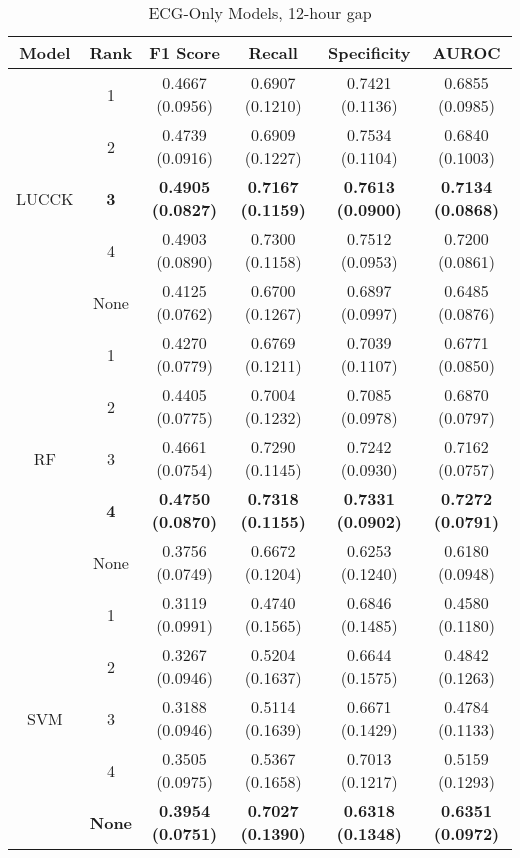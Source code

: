 \begin{table}
    \centering
    \caption{ECG-Only Models, 12-hour gap}
    \begin{tabularx}{\textwidth}{|C|C|C|C|C|C|}
        \hline
        Model & Rank & F1 Score & Recall & Specificity & AUROC \\
        \hline
         & 1 & 0.4667 (0.0956) & 0.6907 (0.1210) & 0.7421 (0.1136) & 0.6855 (0.0985)\\
         & 2 & 0.4739 (0.0916) & 0.6909 (0.1227) & 0.7534 (0.1104) & 0.6840 (0.1003)\\
        LUCCK & \textbf{3} & \textbf{0.4905 (0.0827)} & \textbf{0.7167 (0.1159)} & \textbf{0.7613 (0.0900)} & \textbf{0.7134 (0.0868)}\\
         & 4 & 0.4903 (0.0890) & 0.7300 (0.1158) & 0.7512 (0.0953) & 0.7200 (0.0861)\\
         & None & 0.4125 (0.0762) & 0.6700 (0.1267) & 0.6897 (0.0997) & 0.6485 (0.0876)\\
        \hline
        & 1 &  0.4270 (0.0779) & 0.6769 (0.1211) & 0.7039 (0.1107) & 0.6771 (0.0850)\\
         & 2 & 0.4405 (0.0775) & 0.7004 (0.1232) & 0.7085 (0.0978) & 0.6870 (0.0797)\\
        RF & 3 & 0.4661 (0.0754) & 0.7290 (0.1145) & 0.7242 (0.0930) & 0.7162 (0.0757)\\
         & \textbf{4} & \textbf{0.4750 (0.0870)} & \textbf{0.7318 (0.1155)} & \textbf{0.7331 (0.0902)} & \textbf{0.7272 (0.0791)}\\
         & None & 0.3756 (0.0749) & 0.6672 (0.1204) & 0.6253 (0.1240) & 0.6180 (0.0948)\\
         \hline
         & 1 & 0.3119 (0.0991) & 0.4740 (0.1565) & 0.6846 (0.1485) & 0.4580 (0.1180)\\
         & 2 & 0.3267 (0.0946) & 0.5204 (0.1637) & 0.6644 (0.1575) & 0.4842 (0.1263)\\
        SVM & 3 & 0.3188 (0.0946) & 0.5114 (0.1639) & 0.6671 (0.1429) & 0.4784 (0.1133)\\
         & 4 & 0.3505 (0.0975) & 0.5367 (0.1658) & 0.7013 (0.1217) & 0.5159 (0.1293)\\
         & \textbf{None} & \textbf{0.3954 (0.0751)} & \textbf{0.7027 (0.1390)} & \textbf{0.6318 (0.1348)} & \textbf{0.6351 (0.0972)}\\
        \hline
    \end{tabularx}
\end{table}

